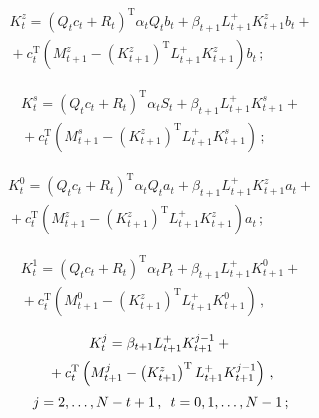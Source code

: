 \begin{multicols}{2}
\vspace*{-6pt}

\noindent
 \begin{multline}
K_t^z = \left(Q_t c_t +R_t\right)^{\mathrm{T}} \alpha_t Q_t b_t +
\beta_{t+1} L^+_{t+1} K^z_{t+1} b_t +{}\\
{} + c_t^{\mathrm{T}}(M^z_{t+1} -\left(K^z_{t+1}\right)^{\mathrm{T}} L^+_{t+1}
K^z_{t+1})b_t\,;
\end{multline}

\vspace*{-12pt}

\noindent
\begin{multline}
 K_t^s = \left(Q_t c_t +R_t\right)^{\mathrm{T}} \alpha_t S_t +\beta_{t+1}L^+_{t+1} K^s_{t+1}
+{}\\
{}+c_t^{\mathrm{T}} (M^s_{t+1} -\left(K^z_{t+1}\right)^{\mathrm{T}} L^+_{t+1} K^s_{t+1})\,;
\end{multline}

\vspace*{-12pt}

\noindent
\begin{multline}
 K_t^0 = \left(Q_t c_t +R_t\right)^{\mathrm{T}} \alpha_t Q_t a_t +\beta_{t+1} L^+_{t+1}
K^z_{t+1} a_t +{}\\[2pt]
{}+c_t^{\mathrm{T}}\left(M^z_{t+1}-\left(K^z_{t+1}\right)^{\mathrm{T}} L^+_{t+1} K^z_{t+1}\right)
a_t\,;
\end{multline}



\noindent
\begin{multline}
 K_t^1 =\left(Q_t c_t +R_t\right)^{\mathrm{T}} \alpha_t P_t +\beta_{t+1}
 L^+_{t+1} K^0_{t+1}+{}\\[2pt]
{}+c_t^{\mathrm{T}}\left(M^0_{t+1}-\left(K^z_{t+1}\right)^{\mathrm{T}} L^+_{t+1} K^0_{t+1}\right)\,,
\end{multline}

\vspace*{-12pt}

\noindent
\begin{multline}
 K_t^j = \beta_{t+1} L^+_{t+1} K_{t+1}^{j-1} +{}\\[2pt]
 {}+c_t^{\mathrm{T}}\left(M_{t+1}^j - \left(K^z_{t+1}\right)^{\mathrm{T}}
 L^+_{t+1} K_{t+1}^{j-1}\right)\,,\\[2pt]
    j=2,\ldots , N-t+1\,,\enskip t\hm=0,1,\ldots , N-1\,;
  \label{e6-bos}
  \end{multline}


\end{multicols}
